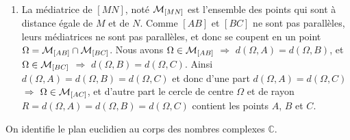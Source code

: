 \documentclass[a4paper,12pt,reqno]{amsart}
\begin{document}
\begin{solution}\newline
  \\[-17mm]
  \begin{enumerate}
    \item La médiatrice de $[MN]$, noté $\mathcal{M}_{[MN]}$ est l'ensemble des points qui sont à distance égale de $M$ et de $N$. Comme $[AB]$ et $[BC]$ ne sont pas parallèles, leurs médiatrices ne sont pas parallèles, et donc se coupent en un point $\Omega=\mathcal{M}_{[AB]}\cap\mathcal{M}_{[BC]}$. Nous avons $\Omega \in \mathcal{M}_{[AB]}$ $\Rightarrow$ $d(\Omega,A)=d(\Omega,B)$, et $\Omega \in \mathcal{M}_{[BC]}$ $\Rightarrow$ $d(\Omega,B)=d(\Omega,C)$. Ainsi $d(\Omega,A)=d(\Omega,B)=d(\Omega,C)$ et donc d'une part $d(\Omega,A)=d(\Omega,C)$ $\Rightarrow$ $\Omega \in \mathcal{M}_{[AC]}$, et d'autre part le cercle de centre $\Omega$ et de rayon $R=d(\Omega,A)=d(\Omega,B)=d(\Omega,C)$ contient les points $A$, $B$ et $C$.
  \end{enumerate}

  On identifie le plan euclidien au corps des nombres complexes $\mathbb{C}$.


\end{solution}
\end{document}
